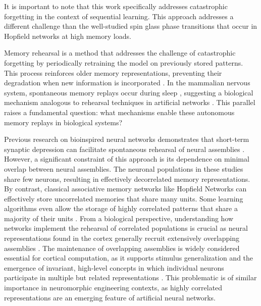 \documentclass[10pt,letterpaper]{article}
\begin{document}
It is important to note that this work specifically addresses catastrophic forgetting in the context of sequential learning. This approach addresses a different challenge than the well-studied spin glass phase transitions that occur in Hopfield networks at high memory loads. 

Memory rehearsal is a method that addresses the challenge of catastrophic forgetting by periodically retraining the model on previously stored patterns. This process reinforces older memory representations, preventing their degradation when new information is incorporated \cite{robins_catastrophic_1995,mccallum_catastrophic_1998}. In the mammalian nervous system, spontaneous memory replays occur during sleep \cite{robins_catastrophic_1995,louie_temporally_2001,peyrache_replay_2009,fauth_self-organized_2019,tononi_sleep_2014}, suggesting a biological mechanism analogous to rehearsal techniques in artificial networks \cite{robins_catastrophic_1995}. This parallel raises a fundamental question: what mechanisms enable these autonomous memory replays in biological systems?

Previous research on bioinspired neural networks demonstrates that short-term synaptic depression can facilitate spontaneous rehearsal of neural assemblies \cite{fauth_self-organized_2019}. However, a significant constraint of this approach is its dependence on minimal overlap between neural assemblies. The neuronal populations in these studies share few neurons, resulting in effectively decorrelated memory representations. By contrast, classical associative memory networks like Hopfield Networks can effectively store uncorrelated memories that share many units. Some learning algorithms even allow the storage of highly correlated patterns that share a majority of their units \cite{diederich_learning_1987}. 
From a biological perspective, understanding how networks implement the rehearsal of correlated populations is crucial as neural representations found in the cortex generally recruit extensively overlapping assemblies \cite{haxby_distributed_2001,kriegeskorte_representational_2008}. The maintenance of overlapping assemblies is widely considered essential for cortical computation, as it supports stimulus generalization and the emergence of invariant, high‑level concepts in which individual neurons participate in multiple but related representations \cite{haxby_distributed_2001,quiroga_invariant_2005,kriegeskorte_representational_2008}. This problematic is of similar importance in neuromorphic engineering contexts, as highly correlated representations are an emerging feature of artificial neural networks\cite{kothapalli_neural_2023}.
\end{document}
